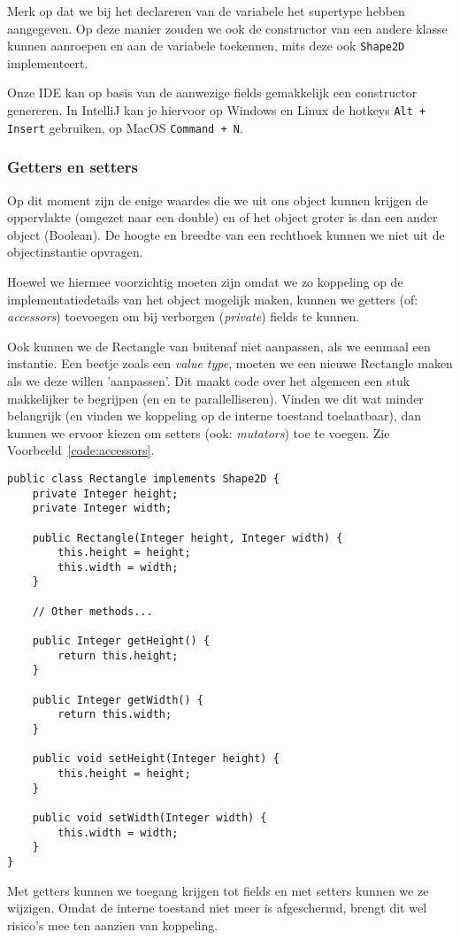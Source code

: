 \documentclass[dutch,a4paper,12pt,doubleside]{book}
\begin{document}
Merk op dat we bij het declareren van de variabele het supertype hebben aangegeven.
Op deze manier zouden we ook de constructor van een andere klasse kunnen aanroepen 
en aan de variabele toekennen, mits deze ook \texttt{Shape2D} implementeert.

Onze IDE kan op basis van de aanwezige fields gemakkelijk een constructor genereren.
In IntelliJ kan je hiervoor op Windows en Linux de hotkeys \texttt{Alt + Insert} gebruiken, 
op MacOS \texttt{Command + N}.

\subsubsection{Getters en setters}
Op dit moment zijn de enige waardes die we uit ons object kunnen krijgen 
de oppervlakte (omgezet naar een double) en of het object groter is dan een ander object (Boolean).
De hoogte en breedte van een rechthoek kunnen we niet uit de objectinstantie opvragen.

Hoewel we hiermee voorzichtig moeten zijn omdat we zo koppeling op de 
implementatiedetails van het object mogelijk maken, kunnen we getters 
(of: \textit{accessors}) toevoegen 
om bij verborgen (\textit{private}) fields te kunnen.

Ook kunnen we de Rectangle van buitenaf niet aanpassen, als we eenmaal een instantie.
Een beetje zoals een \textit{value type}, moeten we een nieuwe Rectangle maken 
als we deze willen 'aanpassen'. Dit maakt code over het algemeen een stuk makkelijker 
te begrijpen (en en te parallelliseren). Vinden we dit wat minder belangrijk
(en vinden we koppeling op de interne toestand toelaatbaar), dan kunnen we 
ervoor kiezen om setters (ook: \textit{mutators}) toe te voegen. 
Zie Voorbeeld~\ref{code:accessors}.

\begin{listing}[ht]
\begin{verbatim}
public class Rectangle implements Shape2D {
    private Integer height;
    private Integer width;

    public Rectangle(Integer height, Integer width) {
        this.height = height;
        this.width = width;
    }

    // Other methods...

    public Integer getHeight() {
        return this.height;
    }

    public Integer getWidth() {
        return this.width;
    }

    public void setHeight(Integer height) {
        this.height = height;
    }

    public void setWidth(Integer width) {
        this.width = width;
    }
}
\end{verbatim}
\caption{Met getters kunnen we toegang krijgen tot fields en met setters kunnen we ze wijzigen.
Omdat de interne toestand niet meer is afgeschermd, 
brengt dit wel risico's mee ten aanzien van koppeling.}
\label{code:getters-setters}
\end{listing}
\end{document}
